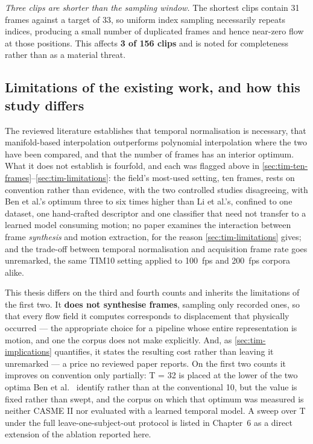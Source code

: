 \textit{Three clips are shorter than the sampling window.} The shortest clips contain 31 frames against a target of 33, so uniform index sampling necessarily repeats indices, producing a small number of duplicated frames and hence near-zero flow at those positions. This affects \textbf{3 of 156 clips} and is noted for completeness rather than as a material threat.

\subsection{Limitations of the existing work, and how this study differs}
\label{sec:tim-gap}

The reviewed literature establishes that temporal normalisation is necessary, that manifold-based interpolation outperforms polynomial interpolation where the two have been compared, and that the number of frames has an interior optimum. What it does not establish is fourfold, and each was flagged above in \autoref{sec:tim-ten-frames}--\autoref{sec:tim-limitations}: the field's most-used setting, ten frames, rests on convention rather than evidence, with the two controlled studies disagreeing, with Ben et al.'s optimum three to six times higher than Li et al.'s, confined to one dataset, one hand-crafted descriptor and one classifier that need not transfer to a learned model consuming motion; no paper examines the interaction between frame \textit{synthesis} and motion extraction, for the reason \autoref{sec:tim-limitations} gives; and the trade-off between temporal normalisation and acquisition frame rate goes unremarked, the same TIM10 setting applied to 100~fps and 200~fps corpora alike.

This thesis differs on the third and fourth counts and inherits the limitations of the first two. It \textbf{does not synthesise frames}, sampling only recorded ones, so that every flow field it computes corresponds to displacement that physically occurred --- the appropriate choice for a pipeline whose entire representation is motion, and one the corpus does not make explicitly. And, as \autoref{sec:tim-implications} quantifies, it states the resulting cost rather than leaving it unremarked --- a price no reviewed paper reports. On the first two counts it improves on convention only partially: T = 32 is placed at the lower of the two optima Ben et al.~\cite{ben2021} identify rather than at the conventional 10, but the value is fixed rather than swept, and the corpus on which that optimum was measured is neither CASME II nor evaluated with a learned temporal model. A sweep over T under the full leave-one-subject-out protocol is listed in Chapter~6 as a direct extension of the ablation reported here.

